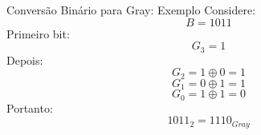 \begin{frame}{Conversão Binário para Gray: Exemplo}
    \small
    Considere:
    \[
        B = 1011
    \]
    Primeiro bit:
    \[
        G_3 = 1
    \]
    Depois:
    \[
        G_2 = 1 \oplus 0 = 1
    \]
    \[
        G_1 = 0 \oplus 1 = 1
    \]
    \[
        G_0 = 1 \oplus 1 = 0
    \]
    Portanto:
    \[
        \boxed{1011_2 = 1110_{Gray}}
    \]
\end{frame}
